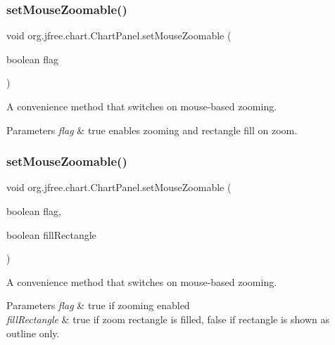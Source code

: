\subsubsection{\texorpdfstring{set\+Mouse\+Zoomable()}{setMouseZoomable()}\hspace{0.1cm}{\footnotesize\ttfamily [1/2]}}
{\footnotesize\ttfamily void org.\+jfree.\+chart.\+Chart\+Panel.\+set\+Mouse\+Zoomable (\begin{DoxyParamCaption}\item[{boolean}]{flag }\end{DoxyParamCaption})}

A convenience method that switches on mouse-\/based zooming.


\begin{DoxyParams}{Parameters}
{\em flag} & {\ttfamily true} enables zooming and rectangle fill on zoom. \\
\hline
\end{DoxyParams}
\mbox{\label{classorg_1_1jfree_1_1chart_1_1_chart_panel_a98d10a662c3c4844c0924581ea40d4fe}} 
\subsubsection{\texorpdfstring{set\+Mouse\+Zoomable()}{setMouseZoomable()}\hspace{0.1cm}{\footnotesize\ttfamily [2/2]}}
{\footnotesize\ttfamily void org.\+jfree.\+chart.\+Chart\+Panel.\+set\+Mouse\+Zoomable (\begin{DoxyParamCaption}\item[{boolean}]{flag,  }\item[{boolean}]{fill\+Rectangle }\end{DoxyParamCaption})}

A convenience method that switches on mouse-\/based zooming.


\begin{DoxyParams}{Parameters}
{\em flag} & {\ttfamily true} if zooming enabled \\
\hline
{\em fill\+Rectangle} & {\ttfamily true} if zoom rectangle is filled, false if rectangle is shown as outline only. \\
\hline
\end{DoxyParams}
\mbox{\label{classorg_1_1jfree_1_1chart_1_1_chart_panel_a7350e5cd7d0840d968947ba76efd12dd}} 
